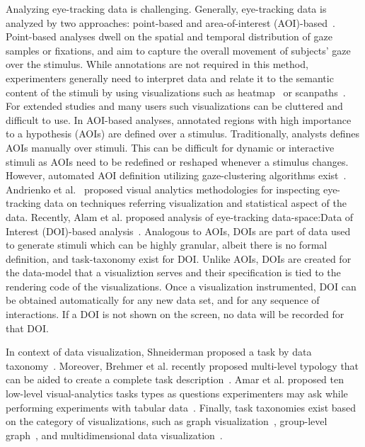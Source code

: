 Analyzing eye-tracking data is challenging. Generally, eye-tracking data is analyzed by two approaches: point-based and area-of-interest (AOI)-based~\cite{blascheck2014state}. Point-based analyses dwell on the spatial and temporal distribution of gaze samples or fixations, and aim to capture the overall movement of subjects' gaze over the stimulus.  While  annotations are not required in this method, experimenters generally need to interpret data and relate it to the semantic content of the stimuli by using visualizations such as heatmap~\cite{mackworth1958eye} or scanpaths~\cite{noton1971scanpathsA, noton1971scanpathsB}. For extended studies and many users such visualizations can be cluttered and difficult to use. In AOI-based analyses, annotated regions with high importance to a hypothesis (AOIs) are defined over a stimulus. Traditionally, analysts defines AOIs manually over stimuli. This can be difficult for dynamic or interactive stimuli as AOIs need to be redefined or reshaped whenever a stimulus changes. However, automated AOI definition utilizing gaze-clustering algorithms exist~\cite{privitera2000algorithms}. Andrienko et al.~\cite{andrienko2012visual} proposed visual analytics methodologies for inspecting eye-tracking data on techniques referring visualization and statistical aspect of the data. Recently, Alam et al. proposed analysis of eye-tracking data-space:Data of Interest (DOI)-based analysis~\cite{alamdata}. Analogous to AOIs, DOIs are part of data used to generate stimuli which can be highly granular, albeit there is no formal definition, and task-taxonomy exist for DOI. Unlike AOIs, DOIs are created for the data-model that a visualiztion serves and their specification is tied to the rendering code of the visualizations. Once a visualization instrumented, DOI can be obtained automatically for any new data set, and for any sequence of interactions. If a DOI is not shown on the screen, no data will be recorded for that DOI.

 In context of data visualization, Shneiderman proposed a task by data taxonomy~\cite{shneiderman1996eyes}. Moreover, Brehmer et al. recently proposed multi-level typology that can be aided to create a complete task description~\cite{brehmer2013multi}. Amar et al. proposed ten low-level visual-analytics tasks types as questions experimenters may ask while performing experiments with tabular data~\cite{amar2005low}. Finally, task taxonomies exist based on the category of visualizations, such as graph visualization~\cite{lee2006task}, group-level graph~\cite{saket2014group}, and multidimensional data visualization~\cite{ward2002taxonomy}. 